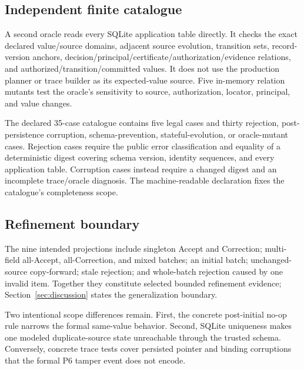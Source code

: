 \subsection{Independent finite catalogue}

A second oracle reads every SQLite application table directly. It checks the exact declared value/source domains, adjacent source evolution, transition sets, record-version anchors, decision/principal/certificate/authorization/evidence relations, and authorized/transition/committed values. It does not use the production planner or trace builder as its expected-value source. Five in-memory relation mutants test the oracle's sensitivity to source, authorization, locator, principal, and value changes.

The declared 35-case catalogue contains five legal cases and thirty rejection, post-persistence corruption, schema-prevention, stateful-evolution, or oracle-mutant cases. Rejection cases require the public error classification and equality of a deterministic digest covering schema version, identity sequences, and every application table. Corruption cases instead require a changed digest and an incomplete trace/oracle diagnosis. The machine-readable declaration fixes the catalogue's completeness scope.

\subsection{Refinement boundary}

The nine intended projections include singleton Accept and Correction; multi-field all-Accept, all-Correction, and mixed batches; an initial batch; unchanged-source copy-forward; stale rejection; and whole-batch rejection caused by one invalid item. Together they constitute selected bounded refinement evidence; Section~\ref{sec:discussion} states the generalization boundary.

Two intentional scope differences remain. First, the concrete post-initial no-op rule narrows the formal same-value behavior. Second, SQLite uniqueness makes one modeled duplicate-source state unreachable through the trusted schema. Conversely, concrete trace tests cover persisted pointer and binding corruptions that the formal P6 tamper event does not encode.
